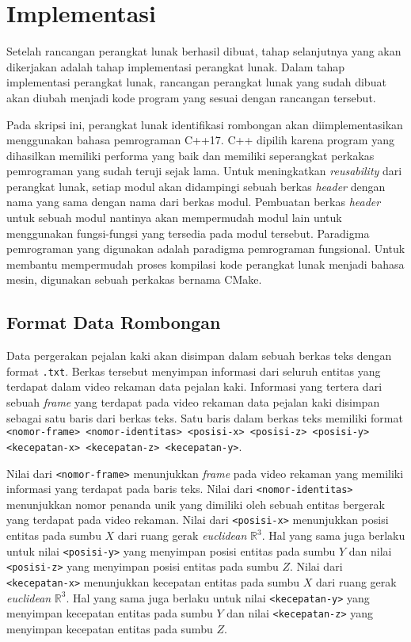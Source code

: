 \chapter{Implementasi}
\label{chap:implementasi}

Setelah rancangan perangkat lunak berhasil dibuat, tahap selanjutnya yang akan dikerjakan adalah tahap implementasi perangkat lunak. Dalam tahap implementasi perangkat lunak, rancangan perangkat lunak yang sudah dibuat akan diubah menjadi kode program yang sesuai dengan rancangan tersebut.

Pada skripsi ini, perangkat lunak identifikasi rombongan akan diimplementasikan menggunakan bahasa pemrograman C++17. C++ dipilih karena program yang dihasilkan memiliki performa yang baik dan memiliki seperangkat perkakas pemrograman yang sudah teruji sejak lama. Untuk meningkatkan \textit{reusability} dari perangkat lunak, setiap modul akan didampingi sebuah berkas \textit{header} dengan nama yang sama dengan nama dari berkas modul. Pembuatan berkas \textit{header} untuk sebuah modul nantinya akan mempermudah modul lain untuk menggunakan fungsi-fungsi yang tersedia pada modul tersebut. Paradigma pemrograman yang digunakan adalah paradigma pemrograman fungsional. Untuk membantu mempermudah proses kompilasi kode perangkat lunak menjadi bahasa mesin, digunakan sebuah perkakas bernama CMake.

\section{Format Data Rombongan}
\label{sec:input-structure}

Data pergerakan pejalan kaki akan disimpan dalam sebuah berkas teks dengan format \texttt{.txt}. Berkas tersebut menyimpan informasi dari seluruh entitas yang terdapat dalam video rekaman data pejalan kaki. Informasi yang tertera dari sebuah \textit{frame} yang terdapat pada video rekaman data pejalan kaki disimpan sebagai satu baris dari berkas teks. Satu baris dalam berkas teks memiliki format \texttt{<nomor-frame> <nomor-identitas> <posisi-x> <posisi-z> <posisi-y> <kecepatan-x> <kecepatan-z> <kecepatan-y>}.

Nilai dari \texttt{<nomor-frame>} menunjukkan \textit{frame} pada video rekaman yang memiliki informasi yang terdapat pada baris teks. Nilai dari \texttt{<nomor-identitas>} menunjukkan nomor penanda unik yang dimiliki oleh sebuah entitas bergerak yang terdapat pada video rekaman. Nilai dari \texttt{<posisi-x>} menunjukkan posisi entitas pada sumbu $X$ dari ruang gerak \textit{euclidean} $\mathbb{R}^3$. Hal yang sama juga berlaku untuk nilai \texttt{<posisi-y>} yang menyimpan posisi entitas pada sumbu $Y$ dan nilai \texttt{<posisi-z>} yang menyimpan posisi entitas pada sumbu $Z$. Nilai dari \texttt{<kecepatan-x>} menunjukkan kecepatan entitas pada sumbu $X$ dari ruang gerak \textit{euclidean} $\mathbb{R}^3$. Hal yang sama juga berlaku untuk nilai \texttt{<kecepatan-y>} yang menyimpan kecepatan entitas pada sumbu $Y$ dan nilai \texttt{<kecepatan-z>} yang menyimpan kecepatan entitas pada sumbu $Z$.

